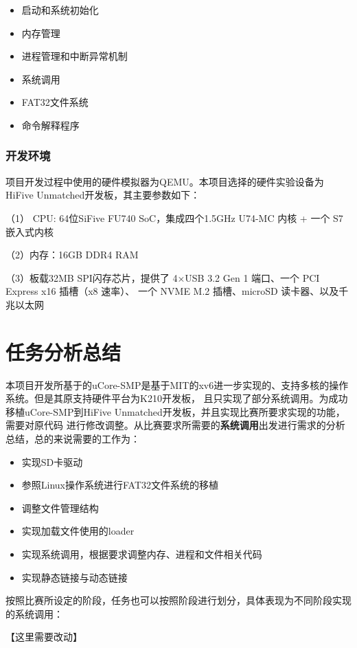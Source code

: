 \documentclass[UTF8,a4paper,10pt]{ctexart}
\begin{document}
\begin{itemize}
  \item 启动和系统初始化
  \item 内存管理
  \item 进程管理和中断异常机制
  \item 系统调用
  \item FAT32文件系统
  \item 命令解释程序
\end{itemize}

\subsubsection{开发环境}

项目开发过程中使用的硬件模拟器为QEMU。本项目选择的硬件实验设备为HiFive Unmatched开发板，其主要参数如下：

（1） CPU: 64位SiFive FU740 SoC，集成四个1.5GHz U74-MC 内核 + 一个 S7 嵌入式内核

（2）内存：16GB DDR4 RAM

（3）板载32MB SPI闪存芯片，提供了 4×USB 3.2 Gen 1 端口、一个 PCI Express x16 插槽（x8 速率）、
一个 NVME M.2 插槽、microSD 读卡器、以及千兆以太网

\section{任务分析总结}

本项目开发所基于的uCore-SMP是基于MIT的xv6进一步实现的、支持多核的操作系统。但是其原支持硬件平台为K210开发板，
且只实现了部分系统调用。为成功移植uCore-SMP到HiFive Unmatched开发板，并且实现比赛所要求实现的功能，需要对原代码
进行修改调整。从比赛要求所需要的\textbf{系统调用}出发进行需求的分析总结，总的来说需要的工作为：

\begin{itemize}
  \item 实现SD卡驱动
  \item 参照Linux操作系统进行FAT32文件系统的移植
  \item 调整文件管理结构
  \item 实现加载文件使用的loader
  \item 实现系统调用，根据要求调整内存、进程和文件相关代码
  \item 实现静态链接与动态链接
\end{itemize}

按照比赛所设定的阶段，任务也可以按照阶段进行划分，具体表现为不同阶段实现的系统调用：

【这里需要改动】
\end{document}
